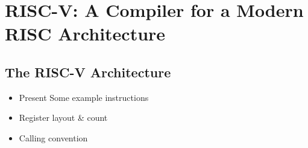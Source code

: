 \section{RISC-V: A Compiler for a Modern RISC Architecture}

\subsection{The RISC-V Architecture}

\begin{itemize}
	\item Present Some example instructions
	\item Register layout \& count
	\item Calling convention
\end{itemize}

